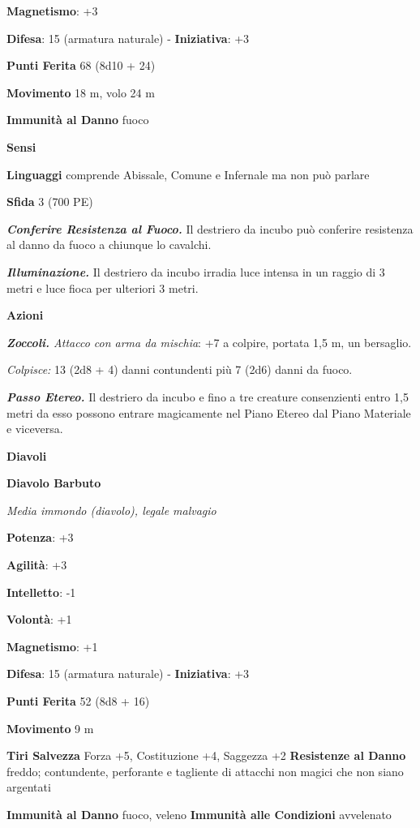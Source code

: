 \begin{multicols}{2}
\textbf{Magnetismo}: +3

\textbf{Difesa}: 15 (armatura naturale) - \textbf{Iniziativa}: +3

\textbf{Punti Ferita} 68 (8d10 + 24)

\textbf{Movimento} 18 m, volo 24 m

\textbf{Immunità al Danno} fuoco

\textbf{Sensi} 

\textbf{Linguaggi} comprende Abissale, Comune e Infernale ma non può
parlare

\textbf{Sfida} 3 (700 PE)

\emph{\textbf{Conferire Resistenza al Fuoco.}} Il destriero da incubo
può conferire resistenza al danno da fuoco a chiunque lo cavalchi.

\emph{\textbf{Illuminazione.}} Il destriero da incubo irradia luce
intensa in un raggio di 3 metri e luce fioca per ulteriori 3 metri.

\textbf{Azioni}

\emph{\textbf{Zoccoli.} Attacco con arma da mischia}: +7 a colpire,
portata 1,5 m, un bersaglio.

\emph{Colpisce:} 13 (2d8 + 4) danni contundenti più 7 (2d6) danni da
fuoco.

\emph{\textbf{Passo Etereo.}} Il destriero da incubo e fino a tre
creature consenzienti entro 1,5 metri da esso possono entrare
magicamente nel Piano Etereo dal Piano Materiale e viceversa.

\textbf{Diavoli}

\textbf{Diavolo Barbuto}

\emph{Media immondo (diavolo), legale malvagio}

\textbf{Potenza}: +3

\textbf{Agilità}: +3

\textbf{Intelletto}: -1

\textbf{Volontà}: +1

\textbf{Magnetismo}: +1

\textbf{Difesa}: 15 (armatura naturale) - \textbf{Iniziativa}: +3

\textbf{Punti Ferita} 52 (8d8 + 16)

\textbf{Movimento} 9 m

\textbf{Tiri Salvezza} Forza +5, Costituzione +4, Saggezza +2
\textbf{Resistenze al Danno} freddo; contundente, perforante e tagliente
di attacchi non magici che non siano argentati

\textbf{Immunità al Danno} fuoco, veleno \textbf{Immunità alle
Condizioni} avvelenato


\end{multicols}
